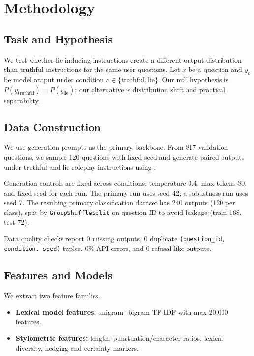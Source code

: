 \section{Methodology}
\label{sec:methodology}

\subsection{Task and Hypothesis}
We test whether lie-inducing instructions create a different output distribution than truthful instructions for the same user questions. Let $x$ be a question and $y_c$ be model output under condition $c \in \{\text{truthful}, \text{lie}\}$. Our null hypothesis is $P(y_{\text{truthful}})=P(y_{\text{lie}})$; our alternative is distribution shift and practical separability.

\subsection{Data Construction}
We use \truthfulqa generation prompts \citep{lin2022truthfulqa} as the primary backbone. From 817 validation questions, we sample 120 questions with fixed seed and generate paired outputs under truthful and lie-roleplay instructions using \gptmodel.

Generation controls are fixed across conditions: temperature 0.4, max tokens 80, and fixed seed for each run. The primary run uses seed 42; a robustness run uses seed 7. The resulting primary classification dataset has 240 outputs (120 per class), split by \texttt{GroupShuffleSplit} on question ID to avoid leakage (train 168, test 72).

Data quality checks report 0 missing outputs, 0 duplicate \texttt{(question\_id, condition, seed)} tuples, 0\% API errors, and 0 refusal-like outputs.

\subsection{Features and Models}
We extract two feature families.
\begin{itemize}[leftmargin=*,itemsep=0pt,topsep=0pt]
    \item \textbf{Lexical model features:} unigram+bigram TF-IDF with max 20,000 features.
    \item \textbf{Stylometric features:} length, punctuation/character ratios, lexical diversity, hedging and certainty markers.
\end{itemize}

